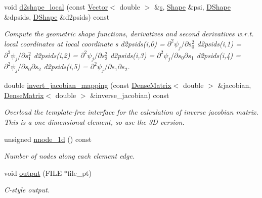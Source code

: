 \begin{DoxyCompactItemize}
void \hyperlink{classoomph_1_1QSpectralElement_3_013_00_01NNODE__1D_01_4_a77b8178ee8422de10a218e5cd636db72}{d2shape\+\_\+local} (const \hyperlink{classoomph_1_1Vector}{Vector}$<$ double $>$ \&\hyperlink{cfortran_8h_ab7123126e4885ef647dd9c6e3807a21c}{s}, \hyperlink{classoomph_1_1Shape}{Shape} \&psi, \hyperlink{classoomph_1_1DShape}{D\+Shape} \&dpsids, \hyperlink{classoomph_1_1DShape}{D\+Shape} \&d2psids) const
\begin{DoxyCompactList}\small\item\em Compute the geometric shape functions, derivatives and second derivatives w.\+r.\+t. local coordinates at local coordinate s d2psids(i,0) = $ \partial ^2 \psi_j / \partial s_0^2 $ d2psids(i,1) = $ \partial ^2 \psi_j / \partial s_1^2 $ d2psids(i,2) = $ \partial ^2 \psi_j / \partial s_2^2 $ d2psids(i,3) = $ \partial ^2 \psi_j / \partial s_0 \partial s_1 $ d2psids(i,4) = $ \partial ^2 \psi_j / \partial s_0 \partial s_2 $ d2psids(i,5) = $ \partial ^2 \psi_j / \partial s_1 \partial s_2 $. \end{DoxyCompactList}\item 
double \hyperlink{classoomph_1_1QSpectralElement_3_013_00_01NNODE__1D_01_4_acd46ab878ddbff7735a36325388626fb}{invert\+\_\+jacobian\+\_\+mapping} (const \hyperlink{classoomph_1_1DenseMatrix}{Dense\+Matrix}$<$ double $>$ \&jacobian, \hyperlink{classoomph_1_1DenseMatrix}{Dense\+Matrix}$<$ double $>$ \&inverse\+\_\+jacobian) const
\begin{DoxyCompactList}\small\item\em Overload the template-\/free interface for the calculation of inverse jacobian matrix. This is a one-\/dimensional element, so use the 3D version. \end{DoxyCompactList}\item 
unsigned \hyperlink{classoomph_1_1QSpectralElement_3_013_00_01NNODE__1D_01_4_aed7979fbbf90426cfc18afcfdc12b6d8}{nnode\+\_\+1d} () const
\begin{DoxyCompactList}\small\item\em Number of nodes along each element edge. \end{DoxyCompactList}\item 
void \hyperlink{classoomph_1_1QSpectralElement_3_013_00_01NNODE__1D_01_4_a2d53eb9e8bb0ecf95bcaadfcffdfd6f0}{output} (F\+I\+LE $\ast$file\+\_\+pt)
\begin{DoxyCompactList}\small\item\em C-\/style output. \end{DoxyCompactList}\item 

\end{DoxyCompactItemize}
